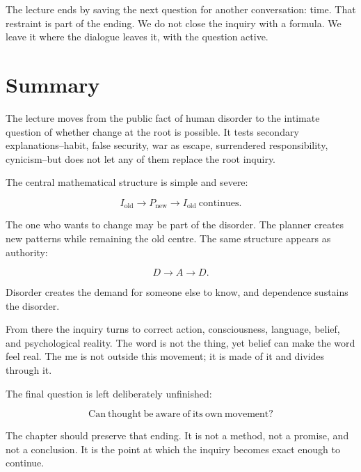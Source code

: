 The lecture ends by saving the next question for another conversation: time. That restraint is part of the ending. We do not close the inquiry with a formula. We leave it where the dialogue leaves it, with the question active.

\section{Summary}

The lecture moves from the public fact of human disorder to the intimate question of whether change at the root is possible. It tests secondary explanations--habit, false security, war as escape, surrendered responsibility, cynicism--but does not let any of them replace the root inquiry.

The central mathematical structure is simple and severe:

\begin{equation}
I_{\mathrm{old}}
\longrightarrow
P_{\mathrm{new}}
\longrightarrow
I_{\mathrm{old}}\ \mathrm{continues}.
\end{equation}

The one who wants to change may be part of the disorder. The planner creates new patterns while remaining the old centre. The same structure appears as authority:

\begin{equation}
D \longrightarrow A \longrightarrow D.
\end{equation}

Disorder creates the demand for someone else to know, and dependence sustains the disorder.

From there the inquiry turns to correct action, consciousness, language, belief, and psychological reality. The word is not the thing, yet belief can make the word feel real. The me is not outside this movement; it is made of it and divides through it.

The final question is left deliberately unfinished:

\begin{equation}
\mathrm{Can\ thought\ be\ aware\ of\ its\ own\ movement?}
\end{equation}

The chapter should preserve that ending. It is not a method, not a promise, and not a conclusion. It is the point at which the inquiry becomes exact enough to continue.